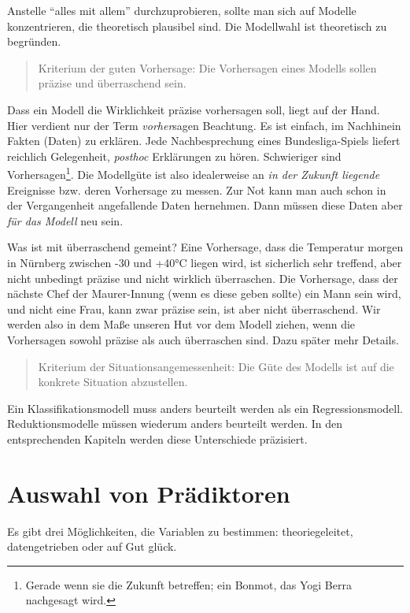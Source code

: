 \documentclass[12pt,]{book}
\let\rmarkdownfootnote\footnote%
\def\footnote{\protect\rmarkdownfootnote}
\begin{document}
Anstelle ``alles mit allem'' durchzuprobieren, sollte man sich auf
Modelle konzentrieren, die theoretisch plausibel sind. Die Modellwahl
ist theoretisch zu begründen.

\begin{quote}
Kriterium der guten Vorhersage: Die Vorhersagen eines Modells sollen
präzise und überraschend sein.
\end{quote}

Dass ein Modell die Wirklichkeit präzise vorhersagen soll, liegt auf der
Hand. Hier verdient nur der Term \emph{vorher}sagen Beachtung. Es ist
einfach, im Nachhinein Fakten (Daten) zu erklären. Jede Nachbesprechung
eines Bundesliga-Spiels liefert reichlich Gelegenheit, \emph{posthoc}
Erklärungen zu hören. Schwieriger sind Vorhersagen\footnote{Gerade wenn
  sie die Zukunft betreffen; ein Bonmot, das Yogi Berra nachgesagt wird.}.
Die Modellgüte ist also idealerweise an \emph{in der Zukunft liegende}
Ereignisse bzw. deren Vorhersage zu messen. Zur Not kann man auch schon
in der Vergangenheit angefallende Daten hernehmen. Dann müssen diese
Daten aber \emph{für das Modell} neu sein.

Was ist mit überraschend gemeint? Eine Vorhersage, dass die Temperatur
morgen in Nürnberg zwischen -30 und +40°C liegen wird, ist sicherlich
sehr treffend, aber nicht unbedingt präzise und nicht wirklich
überraschen. Die Vorhersage, dass der nächste Chef der Maurer-Innung
(wenn es diese geben sollte) ein Mann sein wird, und nicht eine Frau,
kann zwar präzise sein, ist aber nicht überraschend. Wir werden also in
dem Maße unseren Hut vor dem Modell ziehen, wenn die Vorhersagen sowohl
präzise als auch überraschen sind. Dazu später mehr Details.

\begin{quote}
Kriterium der Situationsangemessenheit: Die Güte des Modells ist auf die
konkrete Situation abzustellen.
\end{quote}

Ein Klassifikationsmodell muss anders beurteilt werden als ein
Regressionsmodell. Reduktionsmodelle müssen wiederum anders beurteilt
werden. In den entsprechenden Kapiteln werden diese Unterschiede
präzisiert.

\section{Auswahl von Prädiktoren}\label{auswahl-von-pradiktoren}

Es gibt drei Möglichkeiten, die Variablen zu bestimmen: theoriegeleitet,
datengetrieben oder auf Gut glück.
\end{document}
